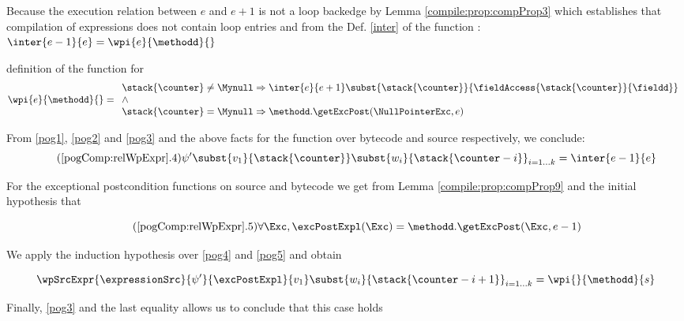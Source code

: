 \begin{description}
		  Because the execution relation between $e$ and $e+1 $ is not a loop backedge by Lemma \ref{compile:prop:compProp3}
		  which establishes that compilation of expressions does not contain loop entries and 
		  from the Def. \ref{inter} of the function \interOnly{}:
		   $ \inter{e-1}{e} = \wpi{e}{\methodd}{}$ 
		
		 definition of the \wpName{} function for \getfield{}
		 \begin{equation*}   \wpi{e}{\methodd}{} = \\
		                     \begin{array}{l} \stack{\counter} \neq \Mynull \Rightarrow \inter{e}{e+1} \subst{\stack{\counter}}{\fieldAccess{\stack{\counter}}{\fieldd} } \\
		                      \wedge \\  
				      \stack{\counter}  = \Mynull \Rightarrow \methodd.\getExcPost(\NullPointerExc, e ) \end{array}
		\end{equation*}
		

		From \eqref{pog1}, \eqref{pog2} and  \eqref{pog3} and the above facts for the \wpName{} function over bytecode and source respectively,
		  we  conclude:
		 \begin{equation*}  	\label{pog4} \tag{\ref{pogComp:relWpExpr}.4}
		        \psi' \subst{v_1}{\stack{\counter}}\subst{w_i}{\stack{\counter - i}}_{i = 1 \ldots k} 	  = \inter{e-1}{e} 
		\end{equation*}
		
		 
		 For the exceptional postcondition functions on source and bytecode we get from Lemma \ref{compile:prop:compProp9} and the initial hypothesis that 
		
		\begin{equation*}  \label{pog5} \tag{\ref{pogComp:relWpExpr}.5}
		   \forall \Exc ,  \excPostExpl( \Exc ) = \methodd.\getExcPost(\Exc, e - 1)  
		 \end{equation*}
		
		We apply the induction hypothesis over   \eqref{pog4} and \eqref{pog5} and  obtain
		 
		\begin{equation*}   
		      \wpSrcExpr{\expressionSrc}{\psi'}{\excPostExpl }{v_1} \subst{w_i}{\stack{\counter - i + 1}}_{i = 1 \ldots k}  = \wpi{}{\methodd}{s}
		\end{equation*}
	
	        Finally,  \eqref{pog3} and the last equality allows us to conclude that this case holds


\end{description}
